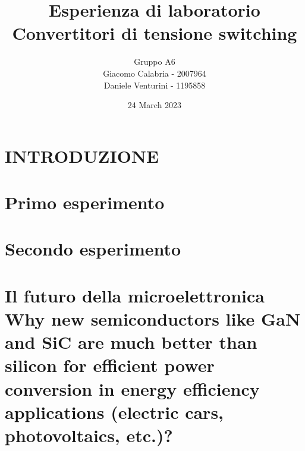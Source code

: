 \documentclass{article}
\title{Esperienza di laboratorio\\\textbf{Convertitori di tensione switching}}
\author{Gruppo A6\\Giacomo Calabria - 2007964\\Daniele Venturini - 1195858}
\date{24 March 2023}
\begin{document}
    \maketitle
    \tableofcontents
    \clearpage
    
    \section*{INTRODUZIONE}
    
    \clearpage
    
    \section{Primo esperimento}
    
    \clearpage
    
    \section{Secondo esperimento}
    
    \clearpage
    
    \section[Il futuro della microelettronica]{Il futuro della microelettronica\\ {\small Why new semiconductors like GaN and SiC are much better than silicon for efficient power conversion in energy efficiency applications (electric cars, photovoltaics, etc.)?}}
    
\end{document}
